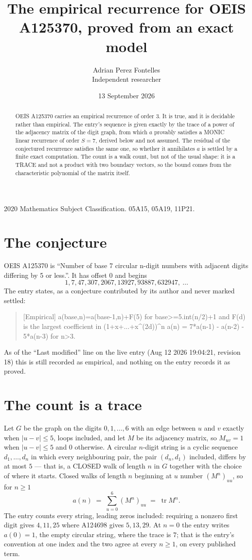 \documentclass[11pt,a4paper]{article}
\title{The empirical recurrence for OEIS A125370, proved from an exact model}
\author{Adrian Perez Fontelles\\ \small Independent researcher}
\date{13 September 2026}
\theoremstyle{plain}
\theoremstyle{definition}
\begin{document}
\maketitle

\begin{abstract}
OEIS A125370 carries an empirical recurrence of order $3$. It is true, and it is
decidable rather than empirical. The entry's sequence is given exactly by the trace of a power of the adjacency matrix of the digit graph, from
which $a$ provably satisfies a MONIC linear recurrence of order $S=7$, derived below and not
assumed. The residual of the conjectured recurrence satisfies the same one, so whether it
annihilates $a$ is settled by a finite exact computation. The count is a walk count, but not of the usual shape: it is a TRACE and not a product with two boundary vectors, so the bound comes from the characteristic polynomial of the matrix itself.
\end{abstract}

\noindent\small 2020 Mathematics Subject Classification. 05A15, 05A19, 11P21.\normalsize

\section{The conjecture}

OEIS A125370 is ``Number of base 7 circular n-digit numbers with adjacent digits differing by 5 or less.''. It has offset $0$ and begins
\[
1, 7, 47, 307, 2067, 13927, 93887, 632947,\ \dots
\]
The entry states, as a conjecture contributed by its author and never marked settled:
\begin{quote}
[Empirical] a(base,n)=a(base-1,n)+F(5) for base>=5.int(n/2)+1 and F(d) is the largest coefficient in (1+x+...+x\^{}(2d))\^{}n a(n) = 7*a(n-1) - a(n-2) - 5*a(n-3) for n>3.
\end{quote}
As of the ``Last modified'' line on the live entry (Aug 12 2026 19:04:21, revision 18)
this is still recorded as empirical, and nothing on the entry records it as proved.

\section{The count is a trace}

Let $G$ be the graph on the digits $0,1,\dots,6$ with an edge between $u$ and $v$ exactly
when $|u-v|\le5$, loops included, and let $M$ be its adjacency matrix, so $M_{uv}=1$ when
$|u-v|\le5$ and $0$ otherwise. A circular $n$-digit string is a cyclic sequence
$d_1,\dots,d_n$ in which every neighbouring pair, the pair $(d_n,d_1)$ included, differs by at
most $5$ --- that is, a CLOSED walk of length $n$ in $G$ together with the choice of where it
starts. Closed walks of length $n$ beginning at $u$ number $(M^n)_{uu}$, so for $n\ge1$
\[
a(n)\;=\;\sum_{u=0}^{6}(M^{n})_{uu}\;=\;\operatorname{tr}M^{n} .
\]
The entry counts every string, leading zeros included: requiring a nonzero first digit gives
$4,11,25$ where A124698 gives $5,13,29$. At $n=0$ the entry writes $a(0)=1$, the empty circular
string, where the trace is $7$; that is the entry's convention at one index and the two agree
at every $n\ge1$, on every published term.
\end{document}
